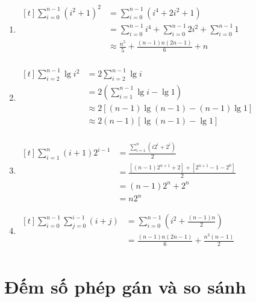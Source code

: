 \documentclass[12pt, letterpaper]{article}
\begin{document}
\begin{enumerate}
	\item $ \begin{aligned}[t]
			      \sum^{n - 1}_{i = 0} {(i^2 + 1)}^2
			       & = \sum^{n - 1}_{i = 0} (i^4 + 2i^2 + 1)                                         \\
			       & = \sum^{n - 1}_{i = 0} i^4 + \sum^{n - 1}_{i = 0} 2i^2 + \sum^{n - 1}_{i = 0} 1 \\
			       & \approx \frac{n^{5}}{5} + \frac{(n - 1)n(2n - 1)}{6} + n                        \\
		      \end{aligned} $

	\item $ \begin{aligned}[t]
			      \sum^{n - 1}_{i = 2} \lg{i^2}
			       & = 2 \sum^{n - 1}_{i = 2} \lg{i}                 \\
			       & = 2 (\sum^{n - 1}_{i = 1} \lg{i} - \lg{1})      \\
			       & \approx 2 [(n - 1)\lg{(n - 1)} - (n - 1)\lg{1}] \\
			       & \approx 2 (n - 1)[\lg{(n - 1)} - \lg{1}]        \\
		      \end{aligned} $

	\item $ \begin{aligned}[t]
			      \sum^{n}_{i = 1} (i + 1)2^{i - 1}
			       & = \frac{\sum^{n}_{i = 1} (i2^i + 2^i)}{2}                  \\
			       & = \frac{[(n - 1)2^{n + 1} + 2] + [2^{n + 1} - 1 - 2^0]}{2} \\
			       & = (n - 1)2^n + 2^n                                         \\
			       & = n2^n
		      \end{aligned} $

	\item $ \begin{aligned}[t]
			      \sum^{n - 1}_{i = 0} \sum^{i - 1}_{j = 0} (i + j)
			       & = \sum^{n - 1}_{i = 0} (i^2 + \frac{(n - 1)n}{2})   \\
			       & = \frac{(n - 1)n(2n - 1)}{6} + \frac{n^2(n - 1)}{2} \\
		      \end{aligned} $
\end{enumerate}

\section{Đếm số phép gán và so sánh}
\end{document}

